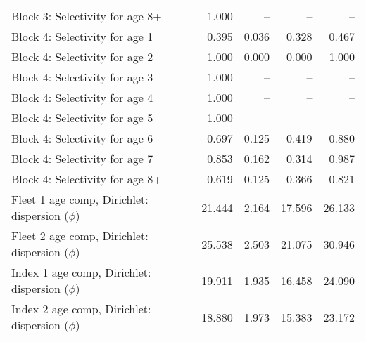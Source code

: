 \documentclass[
]{article}
\begin{document}
\begin{landscape}
\begin{longtable}[t]{lrrrr}
Block 3: Selectivity for age 8+ & 1.000 & -- & -- & --\\
Block 4: Selectivity for age 1 & 0.395 & 0.036 & 0.328 & 0.467\\
Block 4: Selectivity for age 2 & 1.000 & 0.000 & 0.000 & 1.000\\
Block 4: Selectivity for age 3 & 1.000 & -- & -- & --\\
Block 4: Selectivity for age 4 & 1.000 & -- & -- & --\\
\addlinespace
Block 4: Selectivity for age 5 & 1.000 & -- & -- & --\\
Block 4: Selectivity for age 6 & 0.697 & 0.125 & 0.419 & 0.880\\
Block 4: Selectivity for age 7 & 0.853 & 0.162 & 0.314 & 0.987\\
Block 4: Selectivity for age 8+ & 0.619 & 0.125 & 0.366 & 0.821\\
Fleet 1 age comp, Dirichlet: dispersion ($\phi$) & 21.444 & 2.164 & 17.596 & 26.133\\
\addlinespace
Fleet 2 age comp, Dirichlet: dispersion ($\phi$) & 25.538 & 2.503 & 21.075 & 30.946\\
Index 1 age comp, Dirichlet: dispersion ($\phi$) & 19.911 & 1.935 & 16.458 & 24.090\\
Index 2 age comp, Dirichlet: dispersion ($\phi$) & 18.880 & 1.973 & 15.383 & 23.172\\*
\end{longtable}
\end{landscape}
\end{document}
